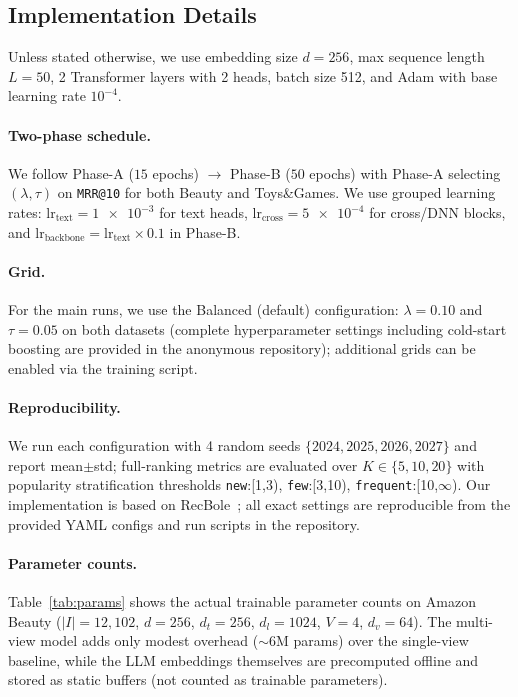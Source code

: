 \documentclass[sigconf,natbib=true,anonymous]{acmart}
\newcommand{\llm}{\textsc{LLM}\xspace}
\begin{document}
\subsection{Implementation Details}
Unless stated otherwise, we use embedding size $d=256$, max
sequence length $L=50$, 2 Transformer layers with 2 heads,
batch size 512, and Adam with base learning rate $10^{-4}$.
\paragraph{Two-phase schedule.}
We follow Phase-A ($15$ epochs) $\rightarrow$ Phase-B ($50$
epochs) with Phase-A selecting $(\lambda,\tau)$ on
\texttt{MRR@10} for both Beauty and Toys\&Games.
We use grouped learning rates:
$\text{lr}_{\text{text}}=\num{1e-3}$ for text heads,
$\text{lr}_{\text{cross}}=\num{5e-4}$ for cross/DNN blocks,
and $\text{lr}_{\text{backbone}}=\text{lr}_{\text{text}}\times
0.1$ in Phase-B.
\paragraph{Grid.}
For the main runs, we use the Balanced (default) configuration:
$\lambda=0.10$ and $\tau=0.05$ on both datasets
(complete hyperparameter settings including cold-start boosting
are provided in the anonymous repository); additional grids can
be enabled via the training script.
\paragraph{Reproducibility.}
We run each configuration with 4 random seeds
$\{2024, 2025, 2026, 2027\}$ and report mean$\pm$std;
full-ranking metrics are evaluated over $K\in\{5,10,20\}$
with popularity stratification thresholds
\texttt{new}:[1,3), \texttt{few}:[3,10),
\texttt{frequent}:[10,$\infty$). Our implementation is based on
RecBole~\cite{zhao2021recbole}; all exact settings are
reproducible from the provided YAML configs and run scripts
in the repository.

\paragraph{Parameter counts.}
Table~\ref{tab:params} shows the actual trainable parameter
counts on Amazon Beauty ($|I|=12,102$, $d=256$, $d_t=256$,
$d_l=1024$, $V=4$, $d_v=64$).
The multi-view model adds only modest overhead (${\sim}6$M
params) over the single-view baseline, while the \llm
embeddings themselves are precomputed offline and stored as
static buffers (not counted as trainable parameters).
\end{document}
